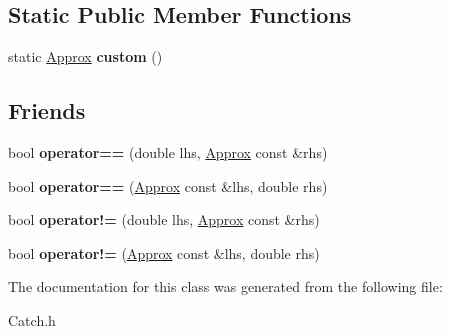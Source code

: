 \subsection*{Static Public Member Functions}
\begin{DoxyCompactItemize}
\item 
\hypertarget{class_catch_1_1_detail_1_1_approx_aaf86dc0ee92272ac2d9839197a07951d}{static \hyperlink{class_catch_1_1_detail_1_1_approx}{Approx} {\bfseries custom} ()}\label{class_catch_1_1_detail_1_1_approx_aaf86dc0ee92272ac2d9839197a07951d}

\end{DoxyCompactItemize}
\subsection*{Friends}
\begin{DoxyCompactItemize}
\item 
\hypertarget{class_catch_1_1_detail_1_1_approx_ac766f044f1c63f0c5997982baefd9049}{bool {\bfseries operator==} (double lhs, \hyperlink{class_catch_1_1_detail_1_1_approx}{Approx} const \&rhs)}\label{class_catch_1_1_detail_1_1_approx_ac766f044f1c63f0c5997982baefd9049}

\item 
\hypertarget{class_catch_1_1_detail_1_1_approx_a35999631e6cef569f9da9f3fa910db22}{bool {\bfseries operator==} (\hyperlink{class_catch_1_1_detail_1_1_approx}{Approx} const \&lhs, double rhs)}\label{class_catch_1_1_detail_1_1_approx_a35999631e6cef569f9da9f3fa910db22}

\item 
\hypertarget{class_catch_1_1_detail_1_1_approx_a83b3763569a7ecc143c335b630be0e47}{bool {\bfseries operator!=} (double lhs, \hyperlink{class_catch_1_1_detail_1_1_approx}{Approx} const \&rhs)}\label{class_catch_1_1_detail_1_1_approx_a83b3763569a7ecc143c335b630be0e47}

\item 
\hypertarget{class_catch_1_1_detail_1_1_approx_a7497ef839f8026cc0edd6269a80f3e09}{bool {\bfseries operator!=} (\hyperlink{class_catch_1_1_detail_1_1_approx}{Approx} const \&lhs, double rhs)}\label{class_catch_1_1_detail_1_1_approx_a7497ef839f8026cc0edd6269a80f3e09}

\end{DoxyCompactItemize}


The documentation for this class was generated from the following file\-:\begin{DoxyCompactItemize}
\item 
Catch.\-h\end{DoxyCompactItemize}
